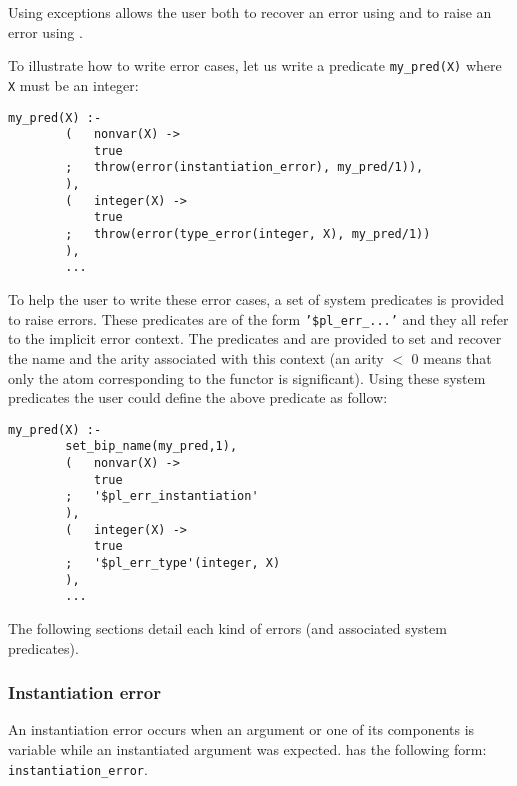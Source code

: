 Using exceptions allows the user both to recover an error using
  and to raise an error using
 . 

To illustrate how to write error cases, let us write a predicate
\texttt{my\_pred(X)} where \texttt{X} must be an integer:

\begin{Indentation}
\begin{verbatim}
my_pred(X) :-
        (   nonvar(X) ->
            true
        ;   throw(error(instantiation_error), my_pred/1)),
        ),
        (   integer(X) ->
            true
        ;   throw(error(type_error(integer, X), my_pred/1))
        ),
        ...
\end{verbatim}
\end{Indentation}

To help the user to write these error cases, a set of system predicates is
provided to raise errors. These predicates are of the form
\texttt{'\$pl\_err\_...'} and they all refer to the implicit error context.
The predicates   and
  are provided to
set and recover the name and the arity associated with this context (an arity
$<$ 0 means that only the atom corresponding to the functor is significant).
Using these system predicates the user could define the above predicate as
follow:

\begin{Indentation}
\begin{verbatim}
my_pred(X) :-
        set_bip_name(my_pred,1),
        (   nonvar(X) ->
            true
        ;   '$pl_err_instantiation'
        ),
        (   integer(X) ->
            true
        ;   '$pl_err_type'(integer, X)
        ),
        ...
\end{verbatim}
\end{Indentation}

The following sections detail each kind of errors (and associated system
predicates).

\subsubsection{Instantiation error}
\label{Instantiation-error}
An instantiation error occurs when an argument or one of its components is
variable while an instantiated argument was expected.
 has the following form:
\texttt{instantiation\_error}.

